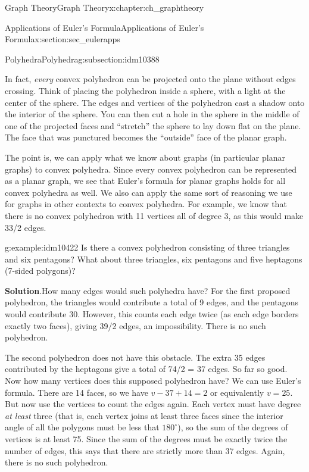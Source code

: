 \documentclass[oneside,10pt,]{book}
\numberwithin{equation}{chapter}
\begin{document}
\begin{chapterptx}{Graph Theory}{}{Graph Theory}{}{}{x:chapter:ch_graphtheory}
\begin{sectionptx}{Applications of Euler's Formula}{}{Applications of Euler's Formula}{}{}{x:section:sec_eulerapps}
\begin{subsectionptx}{Polyhedra}{}{Polyhedra}{}{}{g:subsection:idm10388}
\begin{sidebyside}{1}{0.4}{0.4}{0}
\begin{sbspanel}{0.2}
{}%
\end{sbspanel}%
\end{sidebyside}%
\par
In fact, \emph{every} convex polyhedron can be projected onto the plane without edges crossing. Think of placing the polyhedron inside a sphere, with a light at the center of the sphere. The edges and vertices of the polyhedron cast a shadow onto the interior of the sphere. You can then cut a hole in the sphere in the middle of one of the projected faces and ``stretch'' the sphere to lay down flat on the plane. The face that was punctured becomes the ``outside'' face of the planar graph.%
\par
The point is, we can apply what we know about graphs (in particular planar graphs) to convex polyhedra. Since every convex polyhedron can be represented as a planar graph, we see that Euler's formula for planar graphs holds for all convex polyhedra as well. We also can apply the same sort of reasoning we use for graphs in other contexts to convex polyhedra. For example, we know that there is no convex polyhedron with 11 vertices all of degree 3, as this would make 33\slash{}2 edges.%
\begin{example}{}{g:example:idm10422}%
Is there a convex polyhedron consisting of three triangles and six pentagons? What about three triangles, six pentagons and five heptagons (7-sided polygons)?%
\par\smallskip%
\noindent\textbf{Solution}.\hypertarget{g:solution:idm10425}{}\quad{}How many edges would such polyhedra have? For the first proposed polyhedron, the triangles would contribute a total of 9 edges, and the pentagons would contribute 30. However, this counts each edge twice (as each edge borders exactly two faces), giving 39\slash{}2 edges, an impossibility. There is no such polyhedron.%
\par
The second polyhedron does not have this obstacle. The extra 35 edges contributed by the heptagons give a total of 74\slash{}2 = 37 edges. So far so good. Now how many vertices does this supposed polyhedron have? We can use Euler's formula. There are 14 faces, so we have \(v - 37 + 14 = 2\) or equivalently \(v = 25\). But now use the vertices to count the edges again. Each vertex must have degree \emph{at least} three (that is, each vertex joins at least three faces since the interior angle of all the polygons must be less that \(180^\circ\)), so the sum of the degrees of vertices is at least 75. Since the sum of the degrees must be exactly twice the number of edges, this says that there are strictly more than 37 edges. Again, there is no such polyhedron.%

\end{example}
\end{subsectionptx}
\end{sectionptx}
\end{chapterptx}
\end{document}
